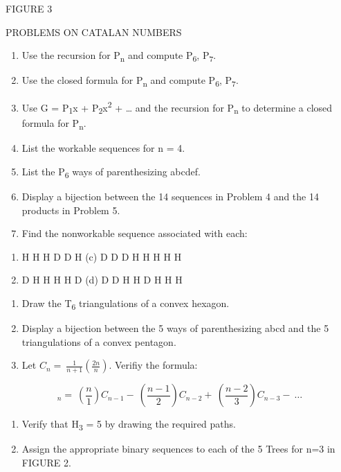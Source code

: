 \documentclass[10pt,letter]{article}
\begin{document}
FIGURE 3

PROBLEMS ON CATALAN NUMBERS
\begin{enumerate}
\def\labelenumi{\arabic{enumi}.}

\item
  Use the recursion for P\textsubscript{n} and compute
  P\textsubscript{6}, P\textsubscript{7}.
\item
  Use the closed formula for P\textsubscript{n} and compute
  P\textsubscript{6}, P\textsubscript{7}.
\item
  Use G = P\textsubscript{1}x + P\textsubscript{2}x\textsuperscript{2} +
  \ldots{} and the recursion for P\textsubscript{n} to determine a
  closed formula for P\textsubscript{n}.
\item
  List the workable sequences for n = 4.
\item
  List the P\textsubscript{6} ways of parenthesizing abcdef.
\item
  Display a bijection between the 14 sequences in Problem 4 and the 14
  products in Problem 5.
\item
  Find the nonworkable sequence associated with each:

\end{enumerate}
\begin{enumerate}
\def\labelenumi{(\alph{enumi})}

\item
  H H H D D H (c) D D D H H H H H
\item
  D H H H H D (d) D D H H D H H H

\end{enumerate}
\begin{enumerate}
\def\labelenumi{\arabic{enumi}.}

\item
  Draw the T\textsubscript{6} triangulations of a convex hexagon.
\item
  Display a bijection between the 5 ways of parenthesizing abcd and the
  5 triangulations of a convex pentagon.
\item
  Let \(C_{n} = \ \frac{1}{n + 1}\left( \frac{2n}{n} \right).\) Verifiy
  the formula:

\end{enumerate}

\[
_{n} = \ \left( \frac{n}{1} \right)C_{n - 1} - \ \left( \frac{n - 1}{2} \right)C_{n - 2} + \ \left( \frac{n - 2}{3} \right)C_{n - 3} - \ \ldots
\]
\begin{enumerate}
\def\labelenumi{\arabic{enumi}.}

\item
  Verify that H\textsubscript{3} = 5 by drawing the required paths.
\item
  Assign the appropriate binary sequences to each of the 5 Trees for n=3
  in FIGURE 2.

\end{enumerate}
\end{document}
